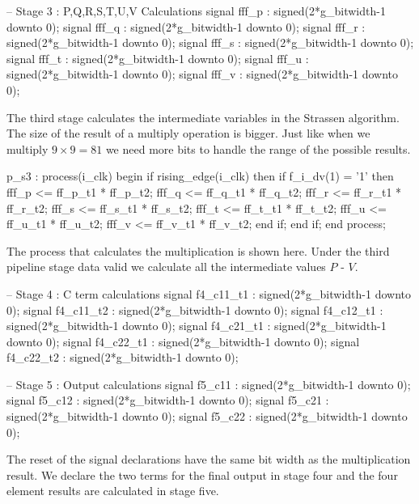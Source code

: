 \begin{VHDLlisting}[tabsize=2]
-- Stage 3 : P,Q,R,S,T,U,V Calculations
signal fff_p   : signed(2*g_bitwidth-1 downto 0);
signal fff_q   : signed(2*g_bitwidth-1 downto 0);
signal fff_r   : signed(2*g_bitwidth-1 downto 0);
signal fff_s   : signed(2*g_bitwidth-1 downto 0);
signal fff_t   : signed(2*g_bitwidth-1 downto 0);
signal fff_u   : signed(2*g_bitwidth-1 downto 0);
signal fff_v   : signed(2*g_bitwidth-1 downto 0);
\end{VHDLlisting}

The third stage calculates the intermediate variables in the Strassen algorithm. The size of the result of a multiply operation is bigger. Just like when we multiply $9 \times 9 = 81$ we need more bits to handle the range of the possible results. 

\begin{VHDLlisting}[tabsize=2]
p_s3 : process(i_clk)
begin
    if rising_edge(i_clk) then
        if f_i_dv(1) = '1' then
            fff_p <= ff_p_t1 * ff_p_t2;
            fff_q <= ff_q_t1 * ff_q_t2;
            fff_r <= ff_r_t1 * ff_r_t2;
            fff_s <= ff_s_t1 * ff_s_t2;
            fff_t <= ff_t_t1 * ff_t_t2;
            fff_u <= ff_u_t1 * ff_u_t2;
            fff_v <= ff_v_t1 * ff_v_t2;
        end if;
    end if;
end process;
\end{VHDLlisting}

The process that calculates the multiplication is shown here. Under the third pipeline stage data valid we calculate all the intermediate values $P$ - $V$. 

\begin{VHDLlisting}[tabsize=2]
-- Stage 4 : C term calculations
signal f4_c11_t1 : signed(2*g_bitwidth-1 downto 0);
signal f4_c11_t2 : signed(2*g_bitwidth-1 downto 0);
signal f4_c12_t1 : signed(2*g_bitwidth-1 downto 0);
signal f4_c21_t1 : signed(2*g_bitwidth-1 downto 0);
signal f4_c22_t1 : signed(2*g_bitwidth-1 downto 0);
signal f4_c22_t2 : signed(2*g_bitwidth-1 downto 0);
               
-- Stage 5 : Output calculations
signal f5_c11    : signed(2*g_bitwidth-1 downto 0);
signal f5_c12    : signed(2*g_bitwidth-1 downto 0);
signal f5_c21    : signed(2*g_bitwidth-1 downto 0);
signal f5_c22    : signed(2*g_bitwidth-1 downto 0);
\end{VHDLlisting}

The reset of the signal declarations have the same bit width as the multiplication result. We declare the two terms for the final output in stage four and the four element results are calculated in stage five. 

